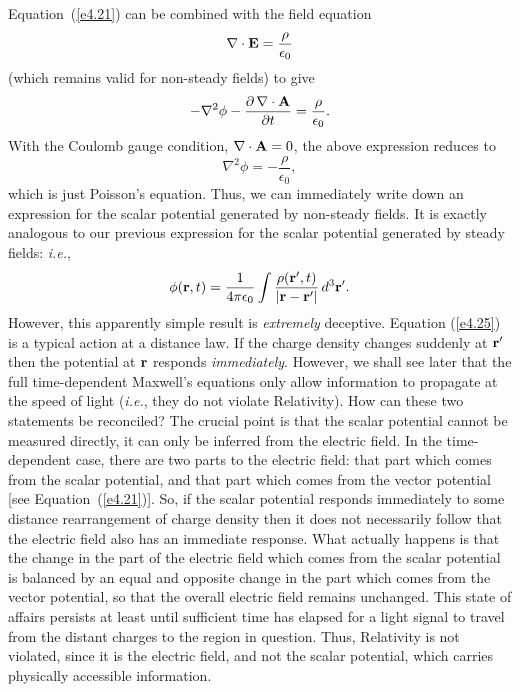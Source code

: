 Equation~(\ref{e4.21}) can be combined with the field equation
\begin{equation}
\nabla\cdot {\bf E} = \frac{\rho}{\epsilon_0}
\end{equation}
(which remains valid for non-steady fields) to give
\begin{equation}\label{e4.23}
-\nabla^2 \phi - 
\frac{\partial \,\nabla\cdot{\bf A}}{\partial t} = \frac{\rho}{\epsilon_0}.
\end{equation}
With the Coulomb gauge condition, $\nabla\cdot{\bf A} = 0$, the above expression
reduces to
\begin{equation}
\nabla^2 \phi = -\frac{\rho}{\epsilon_0},
\end{equation}
which is just Poisson's equation. Thus, we can immediately write down an expression
for the scalar potential generated by  non-steady fields. It is exactly analogous
to our previous expression for the scalar potential generated by steady fields:
{\em i.e.}, 
\begin{equation}\label{e4.25}
\phi({\bf r},t)= \frac{1}{4\pi\epsilon_0}
\int \frac{\rho({\bf r}',t)}{|{\bf r} - {\bf r}'|} \,d^3{\bf r}'.
\end{equation}
However, this apparently simple result is {\em extremely} deceptive.
Equation (\ref{e4.25}) is a typical action at a distance law. If the charge density changes
suddenly at ${\bf r}'$ then the potential at ${\bf r}$ responds {\em immediately}.
However, we shall see later that the full time-dependent Maxwell's equations only
allow information to propagate at the speed of light ({\em i.e.}, they do not violate
Relativity). How can these two statements be reconciled? The crucial point  is
that the scalar potential cannot be measured directly, it can only be inferred
from the electric field. In the time-dependent case, there are two parts to the
electric field: that part which comes from the scalar potential, and that part
which comes from the vector potential [see Equation~(\ref{e4.21})]. So, if the scalar
potential responds immediately to some distance rearrangement of  charge density then
it does not necessarily follow that the electric field also has an immediate response.
What actually happens is that the change in the part of the
electric field which comes from
 the scalar
potential is balanced by an equal and opposite change in the part which comes from the
vector potential, so that the overall electric field remains unchanged. This state
of affairs persists at least until sufficient time has elapsed for a light
signal to travel from the distant charges to the region in question. 
Thus, Relativity is not violated, since it is the
electric field, and not the scalar potential, which carries physically accessible
information.


